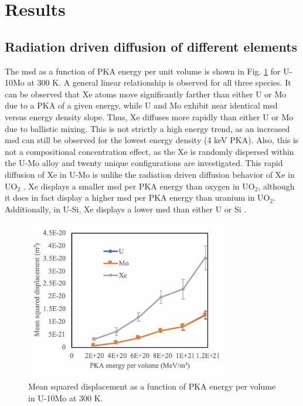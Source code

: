 \documentclass[review]{elsarticle}
\begin{document}
\section{Results}

\subsection{Radiation driven diffusion of different elements}

The msd as a function of PKA energy per unit volume is shown in Fig. \ref{fig:epsB_temp} for U-10Mo at 300 K. A general linear relationship is observed for all three species. It can be observed that Xe atoms move significantly farther than either U or Mo due to a PKA of a given energy, while U and Mo exhibit near identical msd versus energy density slope. Thus, Xe diffuses more rapidly than either U or Mo due to ballistic mixing. This is not strictly a high energy trend, as an increased msd can still be observed for the lowest energy density (4 keV PKA). Also, this is not a compositional concentration effect, as the Xe is randomly dispersed within the U-Mo alloy and twenty unique configurations are investigated. This rapid diffusion of Xe in U-Mo is unlike the radiation driven diffusion behavior of Xe in UO$_2$ \cite{cooper2016}. Xe displays a smaller msd per PKA energy than oxygen in UO$_2$, although it does in fact display a higher msd per PKA energy than uranium in UO$_2$. Additionally, in U-Si, Xe displays a lower msd than either U or Si \cite{cooperUSidiff}. 

\begin{figure}[h]
 \centering
 \includegraphics[width=0.8\textwidth]{3_epsB.png} 
 \caption{Mean squared displacement as a function of PKA energy per volume in U-10Mo at 300 K.}
 \label{fig:epsB_temp}
\end{figure}
\end{document}

